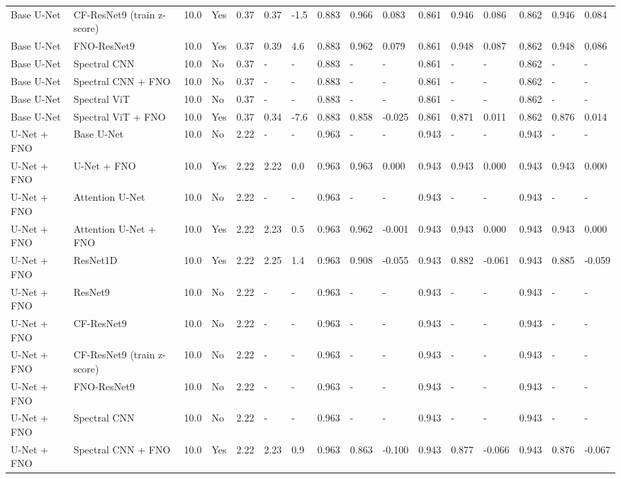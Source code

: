 \begin{longtable}{llllllllllllllll}
Base U-Net & CF-ResNet9 (train z-score) & 10.0 & Yes & 0.37 & 0.37 & -1.5 & 0.883 & 0.966 & 0.083 & 0.861 & 0.946 & 0.086 & 0.862 & 0.946 & 0.084 \\
Base U-Net & FNO-ResNet9 & 10.0 & Yes & 0.37 & 0.39 & 4.6 & 0.883 & 0.962 & 0.079 & 0.861 & 0.948 & 0.087 & 0.862 & 0.948 & 0.086 \\
Base U-Net & Spectral CNN & 10.0 & No & 0.37 & - & - & 0.883 & - & - & 0.861 & - & - & 0.862 & - & - \\
Base U-Net & Spectral CNN + FNO & 10.0 & No & 0.37 & - & - & 0.883 & - & - & 0.861 & - & - & 0.862 & - & - \\
Base U-Net & Spectral ViT & 10.0 & No & 0.37 & - & - & 0.883 & - & - & 0.861 & - & - & 0.862 & - & - \\
Base U-Net & Spectral ViT + FNO & 10.0 & Yes & 0.37 & 0.34 & -7.6 & 0.883 & 0.858 & -0.025 & 0.861 & 0.871 & 0.011 & 0.862 & 0.876 & 0.014 \\
U-Net + FNO & Base U-Net & 10.0 & No & 2.22 & - & - & 0.963 & - & - & 0.943 & - & - & 0.943 & - & - \\
U-Net + FNO & U-Net + FNO & 10.0 & Yes & 2.22 & 2.22 & 0.0 & 0.963 & 0.963 & 0.000 & 0.943 & 0.943 & 0.000 & 0.943 & 0.943 & 0.000 \\
U-Net + FNO & Attention U-Net & 10.0 & No & 2.22 & - & - & 0.963 & - & - & 0.943 & - & - & 0.943 & - & - \\
U-Net + FNO & Attention U-Net + FNO & 10.0 & Yes & 2.22 & 2.23 & 0.5 & 0.963 & 0.962 & -0.001 & 0.943 & 0.943 & 0.000 & 0.943 & 0.943 & 0.000 \\
U-Net + FNO & ResNet1D & 10.0 & Yes & 2.22 & 2.25 & 1.4 & 0.963 & 0.908 & -0.055 & 0.943 & 0.882 & -0.061 & 0.943 & 0.885 & -0.059 \\
U-Net + FNO & ResNet9 & 10.0 & No & 2.22 & - & - & 0.963 & - & - & 0.943 & - & - & 0.943 & - & - \\
U-Net + FNO & CF-ResNet9 & 10.0 & No & 2.22 & - & - & 0.963 & - & - & 0.943 & - & - & 0.943 & - & - \\
U-Net + FNO & CF-ResNet9 (train z-score) & 10.0 & No & 2.22 & - & - & 0.963 & - & - & 0.943 & - & - & 0.943 & - & - \\
U-Net + FNO & FNO-ResNet9 & 10.0 & No & 2.22 & - & - & 0.963 & - & - & 0.943 & - & - & 0.943 & - & - \\
U-Net + FNO & Spectral CNN & 10.0 & No & 2.22 & - & - & 0.963 & - & - & 0.943 & - & - & 0.943 & - & - \\
U-Net + FNO & Spectral CNN + FNO & 10.0 & Yes & 2.22 & 2.23 & 0.9 & 0.963 & 0.863 & -0.100 & 0.943 & 0.877 & -0.066 & 0.943 & 0.876 & -0.067 \\

\end{longtable}
